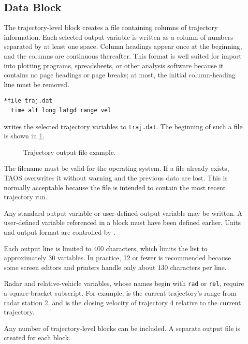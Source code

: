 \subsection{ Data Block}\label{sec:trajectory-block-file}

The trajectory-level  block creates a file containing columns
of trajectory information. Each selected output variable is written as a column of
numbers separated by at least one space. Column headings appear once at the
beginning, and the columns are continuous thereafter. This format is well suited for
import into plotting programs, spreadsheets, or other analysis software because it
contains no page headings or page breaks; at most, the initial column-heading line
must be removed.

\begin{lstlisting}[style=taosmanual]
*file traj.dat
  time alt long latgd range vel
\end{lstlisting}

writes the selected trajectory variables to \texttt{traj.dat}. The beginning of such
a file is shown in \cref{fig:trajectory-output-file-example}.

\begin{figure}[htbp]
  \centering
  \begin{minipage}{0.93\linewidth}
    
  \end{minipage}
  \caption{Trajectory output file example.}
  \label{fig:trajectory-output-file-example}
\end{figure}

The filename must be valid for the operating system. If a file already exists, TAOS
overwrites it without warning and the previous data are lost. This is normally
acceptable because the file is intended to contain the most recent trajectory run.

Any standard output variable or user-defined output variable may be written. A
user-defined variable referenced in a  block must have been
defined earlier. Units and output format are controlled by
.

Each output line is limited to 400 characters, which limits the list to approximately
30 variables. In practice, 12 or fewer is recommended because some screen editors
and printers handle only about 130 characters per line.

Radar and relative-vehicle variables, whose names begin with \texttt{rad} or
\texttt{rel}, require a square-bracket subscript. For example,
 is the current trajectory's range from radar station 2, and
 is the closing velocity of trajectory 4 relative to the current
trajectory.

Any number of trajectory-level  blocks can be included. A
separate output file is created for each block.

